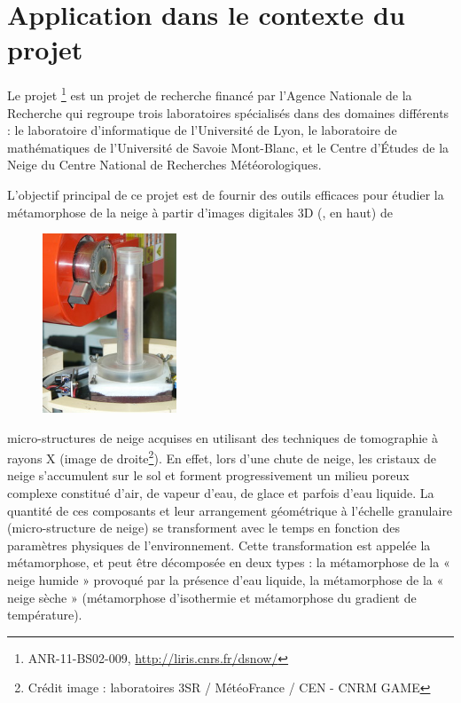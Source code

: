 %
%
%
\section{Application dans le contexte du projet \digitalSnow}%
\label{sec:applications:digitalsnow}
%
Le projet \digitalSnow\footnote{ANR-11-BS02-009,
\url{http://liris.cnrs.fr/dsnow/}} est un projet de recherche financé par
l'Agence Nationale de la Recherche qui regroupe trois laboratoires spécialisés
dans des domaines différents : le laboratoire d'informatique
\textsc{} de l'Université de Lyon, le laboratoire de
mathématiques \textsc{} de l'Université de Savoie Mont-Blanc, et
le Centre d'Études de la Neige \textsc{} du Centre National de
Recherches Météorologiques.


L'objectif principal de ce projet est de fournir des outils efficaces pour
étudier la métamorphose de la neige à partir d'images digitales 3D
(, en haut) de
%
\begin{figure}
	\includegraphics[width=4cm]{images/digitalSnow/YTEjpE}
\end{figure}
%
micro-structures de neige acquises en utilisant des techniques de tomographie à
rayons X (image de droite\footnote{Crédit image : laboratoires 3SR / MétéoFrance / CEN - CNRM GAME}). En effet,
lors d'une chute de neige, les cristaux de neige s'accumulent sur le sol et
forment progressivement un milieu poreux complexe constitué d'air, de vapeur
d'eau, de glace et parfois d'eau liquide. La quantité de ces composants et leur
arrangement géométrique à l'échelle granulaire (micro-structure de neige) se
transforment avec le temps en fonction des paramètres physiques de
l'environnement. Cette transformation est appelée la métamorphose, et peut être
décomposée en deux types : la métamorphose de la « neige humide » provoqué par
la présence d'eau liquide, la métamorphose de la « neige sèche » (métamorphose
d'isothermie et métamorphose du gradient de température).

